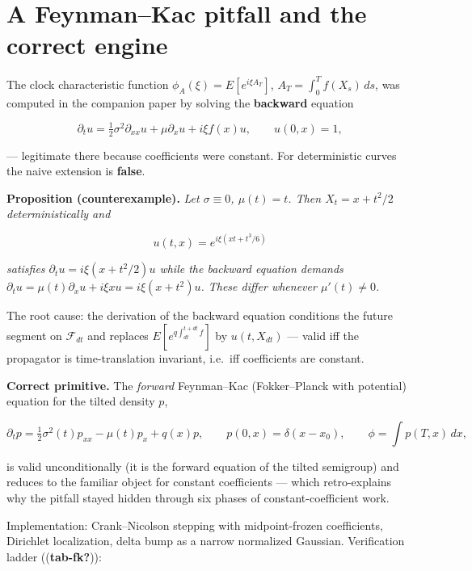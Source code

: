 \documentclass[
  english,
  10pt,
  letterpaper,
  DIV=11,
  numbers=noendperiod]{scrartcl}
\begin{document}
\section{A Feynman--Kac pitfall and the correct
engine}\label{sec-pitfall}

The clock characteristic function \(\phi_A(\xi)=E[e^{i\xi A_T}]\),
\(A_T=\int_0^T f(X_s)\,ds\), was computed in the companion paper by
solving the \textbf{backward} equation

\[
\partial_t u=\tfrac12\sigma^2\partial_{xx}u+\mu\partial_xu+i\xi f(x)u,
\qquad u(0,x)=1,
\]

--- legitimate there because coefficients were constant. For
deterministic curves the naive extension is \textbf{false}.

\textbf{Proposition (counterexample).} \emph{Let \(\sigma\equiv0\),
\(\mu(t)=t\). Then \(X_t=x+t^2/2\) deterministically and}

\[
u(t,x)=e^{i\xi(xt+t^3/6)}
\]

\emph{satisfies \(\partial_tu=i\xi(x+t^2/2)u\) while the backward
equation demands \(\partial_tu=\mu(t)\partial_xu+i\xi xu=i\xi(x+t^2)u\).
These differ whenever \(\mu'(t)\ne0\).}

The root cause: the derivation of the backward equation conditions the
future segment on \(\mathcal F_{dt}\) and replaces
\(E[e^{q\int_{dt}^{t+dt}f}]\) by \(u(t,X_{dt})\) --- valid iff the
propagator is time-translation invariant, i.e.~iff coefficients are
constant.

\textbf{Correct primitive.} The \emph{forward} Feynman--Kac
(Fokker--Planck with potential) equation for the tilted density \(p\),

\[
\partial_tp=\tfrac12\sigma^2(t)p_{xx}-\mu(t)p_x+q(x)p,
\qquad p(0,x)=\delta(x-x_0),
\qquad \phi=\int p(T,x)\,dx ,
\]

is valid unconditionally (it is the forward equation of the tilted
semigroup) and reduces to the familiar object for constant coefficients
--- which retro-explains why the pitfall stayed hidden through six
phases of constant-coefficient work.

Implementation: Crank--Nicolson stepping with midpoint-frozen
coefficients, Dirichlet localization, delta bump as a narrow normalized
Gaussian. Verification ladder ((\textbf{tab-fk?})):
\end{document}
